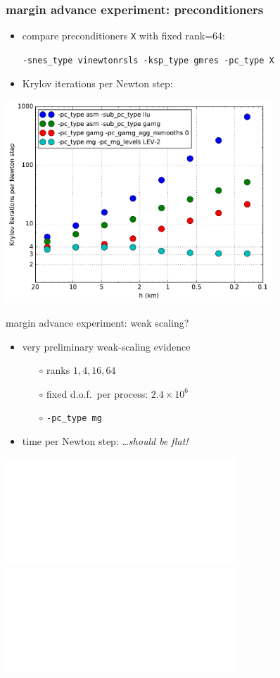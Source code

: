 \documentclass[hide notes,intlimits,usenames,dvipsnames]{beamer}
\begin{document}
\begin{frame}[fragile]
\frametitle{margin advance experiment: preconditioners}
\begin{itemize}
\item compare preconditioners \texttt{X} with fixed rank=64:

\small
\centerline{\texttt{-snes\_type vinewtonrsls -ksp\_type gmres -pc\_type X}}
\normalsize
\item Krylov iterations per Newton step:
\end{itemize}

\begin{center}
\includegraphics[width=0.75\textwidth]{pcksppernewton.pdf}
\end{center}
\end{frame}


\begin{frame}{margin advance experiment:  weak scaling?}
\begin{itemize}
\item very preliminary weak-scaling evidence
    \begin{itemize}
    \item[$\circ$] ranks $1,4,16,64$
    \item[$\circ$] fixed d.o.f.~per process: $2.4 \times 10^6$
    \item[$\circ$] \texttt{-pc\_type mg}
    \end{itemize}
\item time per Newton step: \hfill \dots \emph{should be flat!}
\end{itemize}

\begin{center}
\includegraphics<1>[width=0.65\textwidth]{timepernewtonweak.pdf}
\includegraphics<2>[width=0.65\textwidth]{withdtratioweak.pdf}
\end{center}
\end{frame}
\end{document}
